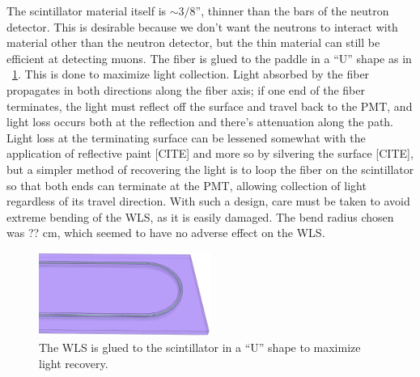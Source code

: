 The scintillator material itself is $\sim3/8$'', thinner than the bars of the neutron detector.  This is desirable because we don't want the neutrons to interact with material other than the neutron detector, but the thin material can still be efficient at detecting muons.  The fiber is glued to the paddle in a ``U'' shape as in {\fig}~\ref{fig:paddle}.  This is done to maximize light collection.  Light absorbed by the fiber propagates in both directions along the fiber axis; if one end of the fiber terminates, the light must reflect off the surface and travel back to the PMT, and light loss occurs both at the reflection and there's attenuation along the path.  Light loss at the terminating surface can be lessened somewhat with the application of reflective paint [CITE] and more so by silvering the surface [CITE], but a simpler method of recovering the light is to loop the fiber on the scintillator so that both ends can terminate at the PMT, allowing collection of light regardless of its travel direction.  With such a design, care must be taken to avoid extreme bending of the WLS, as it is easily damaged.  The bend radius chosen was ?? cm, which seemed to have no adverse effect on the WLS.
\begin{figure}[htp]
\centering
\includegraphics[width=0.5\textwidth]{figures/veto_end.eps}
\caption{The WLS is glued to the scintillator in a ``U'' shape to maximize light recovery.}
\label{fig:paddle}
\end{figure}


